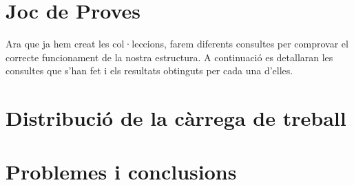 \documentclass{article}
\begin{document}
\section{Joc de Proves}
Ara que ja hem creat les col·leccions, farem diferents consultes per comprovar el correcte funcionament de la nostra estructura. A continuaci\'o es detallaran les consultes que s'han fet i els resultats obtinguts per cada una d'elles.

\section{Distribuci\'o de la c\`arrega de treball}

\section{Problemes i conclusions}
\end{document}
